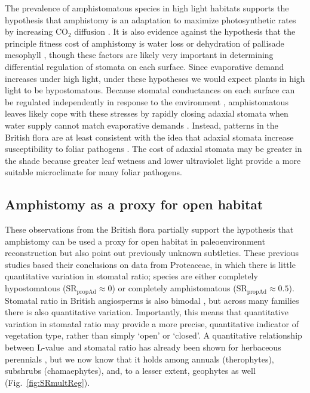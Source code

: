 \documentclass[12pt, oneside]{article}
\newcommand{\el}{L-value}
\begin{document}
The prevalence of amphistomatous species in high light habitats supports the hypothesis that amphistomy is an adaptation to maximize photosynthetic rates by increasing CO$_2$ diffusion \citep{Jones_1985}. It is also evidence against the hypothesis that the principle fitness cost of amphistomy is water loss \citep{Darwin_1886, Foster_Smith_1986} or dehydration of pallisade mesophyll \citep{Buckley_etal_2015}, though these factors are likely very important in determining differential regulation of stomata on each surface. Since evaporative demand increases under high light, under these hypotheses we would expect plants in high light to be hypostomatous. Because stomatal conductances on each surface can be regulated independently in response to the environment \citep{Darwin_1898, Pospisilova_Solarova_1980, Smith_1981, Reich_1984, Mott_Oleary_1984}, amphistomatous leaves likely cope with these stresses by rapidly closing adaxial stomata when water supply cannot match evaporative demands \citep{Richardson_etal_2017}. Instead, patterns in the British flora are at least consistent with the idea that adaxial stomata increase susceptibility to foliar pathogens \citep{Gutschick_1984b, Mckown_etal_2014}. The cost of adaxial stomata may be greater in the shade because greater leaf wetness and lower ultraviolet light provide a more suitable microclimate for many foliar pathogens.

\subsection*{Amphistomy as a proxy for open habitat}

These observations from the British flora partially support the hypothesis that amphistomy can be used a proxy for open habitat in paleoenvironment reconstruction \citep{Carpenter_1994, Jordan_etal_2014, Carpenter_etal_2015} but also point out previously unknown subtleties. These previous studies based their conclusions on data from Proteaceae, in which there is little quantitative variation in stomatal ratio; species are either completely hypostomatous ($\mathrm{SR_{propAd}} \approx 0$) or completely amphistomatous ($\mathrm{SR_{propAd}} \approx 0.5$). Stomatal ratio in British angiosperms is also bimodal \citep{Peat_Fitter_1994b}, but across many families there is also quantitative variation. Importantly, this means that quantitative variation in stomatal ratio may provide a more precise, quantitative indicator of vegetation type, rather than simply `open' or `closed'. A quantitative relationship between \el~and stomatal ratio has already been shown for herbaceous perennials \citep{Bucher_etal_2017}, but we now know that it holds among annuals (therophytes), subshrubs (chamaephytes), and, to a lesser extent, geophytes as well (Fig.~\ref{fig:SRmultReg}). 
\end{document}

